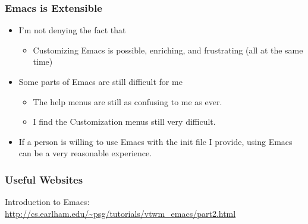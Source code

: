 \documentclass[11pt,english]{beamer}
\begin{document}
\begin{frame}
  \frametitle{Emacs is Extensible}
  \begin{itemize}
  \item I'm not denying the fact that 

    \begin{itemize}
    \item Customizing Emacs is possible, enriching, and frustrating (all at
      the same time)
    \end{itemize}
  \item Some parts of Emacs are still difficult for me

    \begin{itemize}
    \item The help menus are still as confusing to me as ever. 
    \item I find the Customization menus still very difficult. 
    \end{itemize}
  \item If a person is willing to use Emacs with the init file I provide,
    using Emacs can be a very reasonable experience. 
  \end{itemize}
\end{frame}

\begin{frame}[containsverbatim]
  \frametitle{Useful Websites}

  Introduction to Emacs: \url{http://cs.earlham.edu/~psg/tutorials/vtwm_emacs/part2.html}

\end{frame}
\end{document}

